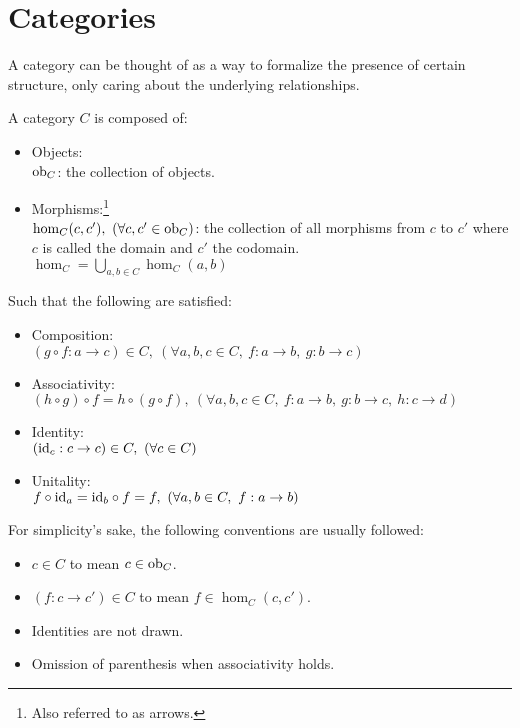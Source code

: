 \section{Categories}
A category can be thought of as a way to formalize the presence of certain
structure, only caring about the underlying relationships.

\begin{definition}[Category]
  A category $C$ is composed of: \parencite{fong_spivak:7sketches}
  \begin{itemize}
    \item Objects:\\
      $\mathrm{ob}_C$: the collection of objects.
    \item Morphisms:\footnote{Also referred to as arrows.}\\
      $\hom_C(c, c'),\ (\forall c, c' \in \mathrm{ob}_C)$: the collection of all
      morphisms from $c$ to $c'$ where $c$ is called the domain and $c'$ the
      codomain.\\
      $\hom_C = \bigcup\limits_{a,b\in C} \hom_C(a,b)$
  \end{itemize}

  Such that the following are satisfied:
  \begin{itemize}
    \item Composition:\\
      $(g \circ f : a \to c) \in C,
        \ (\forall a, b, c \in C,\ f: a \to b,\ g:b \to c)$
    \item Associativity:\\
      $(h \circ g) \circ f = h \circ (g \circ f), \ (\forall a,b,c\in C,\ f:a\to
        b,\ g:b\to c,\ h:c\to d)$
    \item Identity:\\
      $(\mathrm{id}_c: c \to c) \in C,\ (\forall c \in C)$
    \item Unitality:\\
      $f \circ \mathrm{id}_a = \mathrm{id}_b \circ f = f,
        \ (\forall a, b \in C,\ f: a \to b)$
  \end{itemize}
\end{definition}

\begin{remark}
  For simplicity's sake, the following conventions are usually followed:
  \begin{itemize}
    \item $c\in C$ to mean $c\in\mathrm{ob}_C$.
    \item $(f: c\to c')\in C$ to mean $f\in \hom_C(c, c')$.
    \item Identities are not drawn.
    \item Omission of parenthesis when associativity holds.
  \end{itemize}
\end{remark}

